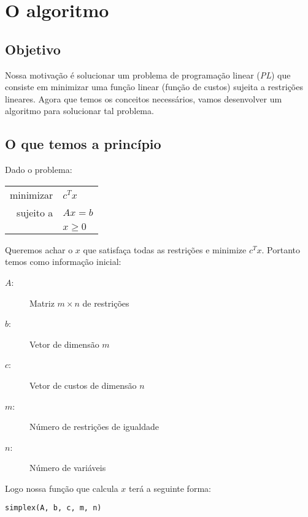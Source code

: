 \documentclass[12pt]{article}
\begin{document}
    
    
\section{O algoritmo}

\subsection{Objetivo}
	Nossa motivação é solucionar um problema de programação linear (\emph{PL}) que consiste em minimizar uma função linear (função de custos) sujeita a restrições lineares. Agora que temos os conceitos necessários, vamos desenvolver um algoritmo para solucionar tal problema.

\subsection{O que temos a princípio}
\label{fase2:args}
	Dado o problema:
    \begin{center}
    	\begin{tabular}{r l}
	  		minimizar & $c^Tx$ \\
        
        	sujeito a & $Ax = b$ \\
            & $x \geq 0$ \\
        \end{tabular}
    \end{center}
  
	Queremos achar o $x$ que satisfaça todas as restrições e minimize $c^Tx$. Portanto temos como informação inicial: 
	\begin{description}
		\item[$A$:] Matriz $m \times n$ de restrições
		\item[$b$:] Vetor de dimensão $m$
        \item[$c$:] Vetor de custos de dimensão $n$
        \item[$m$:] Número de restrições de igualdade
        \item[$n$:] Número de variáveis
	\end{description}

    Logo nossa função que calcula $x$ terá a seguinte forma: \\
    \begin{center}
    \texttt{simplex(A, b, c, m, n)}
    \end{center}
\end{document}
